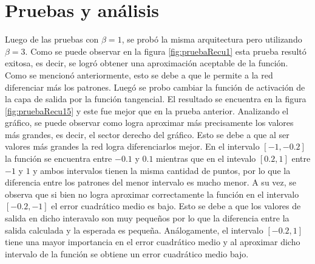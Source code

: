 \documentclass[11pt,a4paper]{article}
\begin{document}
\section{Pruebas y análisis}
 
Luego de las pruebas con $\beta = 1$, se probó la misma arquitectura pero utilizando $\beta = 3$. Como se puede observar en la figura \ref{fig:pruebaRecu1} esta prueba resultó exitosa, es decir, se logró obtener una aproximación aceptable de la función. Como se mencionó anteriormente, esto se debe a que le permite  a la red diferenciar más los patrones. Luegó se probo cambiar la función de activación de la capa de salida por la función tangencial. El resultado se encuentra en la figura \ref{fig:pruebaRecu15} y este fue mejor que en la prueba anterior. Analizando el gráfico, se puede observar como logra aproximar más precisamente los valores más grandes, es decir, el sector derecho del gráfico. Esto se debe a que al ser valores más grandes la red logra diferenciarlos mejor. En el intervalo $[-1, -0.2]$ la función se encuentra entre $-0.1$ y $0.1$ mientras que en el intevalo $[0.2, 1]$ entre $-1$ y $1$ y ambos intervalos tienen la misma cantidad de puntos, por lo que la diferencia entre los patrones del menor intervalo es mucho menor. A su vez, se observa que si bien no logra aproximar correctamente la función en  el intervalo $[- 0.2, -1]$ el error cuadrático medio es bajo. Esto se debe a que los valores de salida en dicho interavalo son muy pequeños por lo que la diferencia entre la salida calculada y la esperada es pequeña. Análogamente, el intervalo $[-0.2, 1]$ tiene una mayor importancia en el error cuadrático medio y al aproximar dicho intervalo de la función se obtiene un error cuadrático medio bajo.
\end{document}
